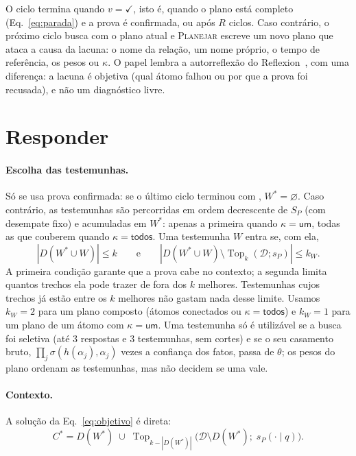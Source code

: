 \documentclass[11pt]{article}
\theoremstyle{definition}
\theoremstyle{plain}
\newcommand{\op}[1]{\textsc{#1}}
\newcommand{\D}{\mathcal{D}}          %
\newcommand{\Top}{\operatorname{Top}}
\newcommand{\um}{\textsf{um}}
\newcommand{\todos}{\textsf{todos}}
\newcommand{\ok}{\checkmark}
\begin{document}
O ciclo termina quando $v=\ok$, isto é, quando o plano está completo
(Eq.~\eqref{eq:parada}) e a prova é confirmada, ou após $R$ ciclos. Caso
contrário, o próximo ciclo busca com o plano atual e \op{Planejar} escreve um
novo plano que ataca a causa da lacuna: o nome da relação, um nome próprio, o
tempo de referência, os pesos ou $\kappa$. O papel lembra a autorreflexão do
Reflexion~\citep{shinn2023reflexion}, com uma diferença: a lacuna é objetiva
(qual átomo falhou ou por que a prova foi recusada), e não um diagnóstico
livre.

\section{Responder}
\label{sec:responder}

\paragraph{Escolha das testemunhas.} Só se usa prova confirmada: se o último
ciclo terminou com , $W^\ast=\varnothing$. Caso contrário, as
testemunhas são percorridas em ordem decrescente de $S_P$ (com desempate fixo)
e acumuladas em $W^\ast$: apenas a primeira quando $\kappa=\um$, todas as que
couberem quando $\kappa=\todos$. Uma testemunha $W$ entra se, com ela,
\begin{equation}
\label{eq:escolha}
|D(W^\ast\cup W)|\le k
\qquad\text{e}\qquad
|D(W^\ast\cup W)\setminus\Top_k(\D;s_P)|\le k_W .
\end{equation}
A primeira condição garante que a prova cabe no contexto; a segunda limita
quantos trechos ela pode trazer de fora dos $k$ melhores. Testemunhas cujos
trechos já estão entre os $k$ melhores não gastam nada desse limite. Usamos
$k_W=2$ para um plano composto (átomos conectados ou $\kappa=\todos$) e
$k_W=1$ para um plano de um átomo com $\kappa=\um$. Uma testemunha só é
utilizável se a busca foi seletiva (até 3 respostas e 3 testemunhas, sem
cortes) e se o seu casamento bruto, $\prod_j\sigma(h(\alpha_j),\alpha_j)$
vezes a confiança dos fatos, passa de $\theta$; os pesos do plano ordenam as
testemunhas, mas não decidem se uma vale.

\paragraph{Contexto.} A solução da Eq.~\eqref{eq:objetivo} é direta:
\begin{equation}
\label{eq:contexto}
C^\ast=D(W^\ast)\;\cup\;\Top_{k-|D(W^\ast)|}\big(\D\setminus D(W^\ast);\;s_P(\cdot\mid q)\big).
\end{equation}
\end{document}
